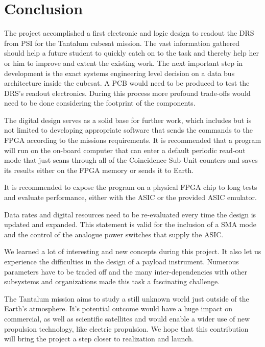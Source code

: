 \section{Conclusion}
\label{sec:conclusion}
The project accomplished a first electronic and logic design to readout the DRS from PSI for the Tantalum cubesat mission.
The vast information gathered should help a future student to quickly catch on to the task and thereby help her or him to improve and extent the existing work.
The next important step in development is the exact systems engineering level decision on a data bus architecture inside the cubesat.
A PCB would need to be produced to test the DRS's readout electronics.
During this process more profound trade-offs would need to be done considering the footprint of the components.
\newline 

The digital design serves as a solid base for further work, which includes but is not limited to developing appropriate software that sends the commands to the FPGA according to the missions requirements. It is recommended that a program will run on the on-board computer that can enter a default periodic read-out mode that just scans through all of the Coincidence Sub-Unit counters and saves its results either on the FPGA memory or sends it to Earth.

It is recommended to expose the program on a physical FPGA chip to long tests and evaluate performance, either with the ASIC or the provided ASIC emulator. 

Data rates and digital resources need to be re-evaluated every time the design is updated and expanded. This statement is valid for the inclusion of a SMA mode and the control of the analogue power switches that supply the ASIC.
\newline


We learned a lot of interesting and new concepts during this project.
It also let us experience the difficulties in the design of a payload instrument.
Numerous parameters have to be traded off and the many inter-dependencies with other subsystems and organizations made this task a fascinating challenge.
\newline

The Tantalum mission aims to study a still unknown world just outside of the Earth's atmosphere.
It's potential outcome would have a huge impact on commercial, as well as scientific satellites and would enable a wider use of new propulsion technology, like electric propulsion.
We hope that this contribution will bring the project a step closer to realization and launch.

